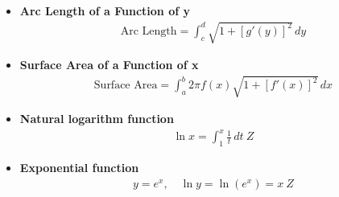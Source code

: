 \documentclass{report}
\begin{document}
\begin{itemize}
    \item \textbf{Arc Length of a Function of y}
    \begin{align}
        \text{Arc Length} = \int_{c}^{d} \sqrt{1 + [g'(y)]^2} \, dy
    \end{align}

    \item \textbf{Surface Area of a Function of x}
    \begin{align}
        \text{Surface Area} = \int_{a}^{b} 2\pi f(x) \sqrt{1 + [f'(x)]^2} \, dx
    \end{align}
    \item \textbf{Natural logarithm function}
    \begin{align}
        \ln x = \int_{1}^{x} \frac{1}{t} \, dt\ Z
    \end{align}

    \item \textbf{Exponential function}
    \begin{align}
        y = e^x, \quad \ln y = \ln(e^x) = x\ Z
    \end{align}


    \end{itemize}
\end{document}
